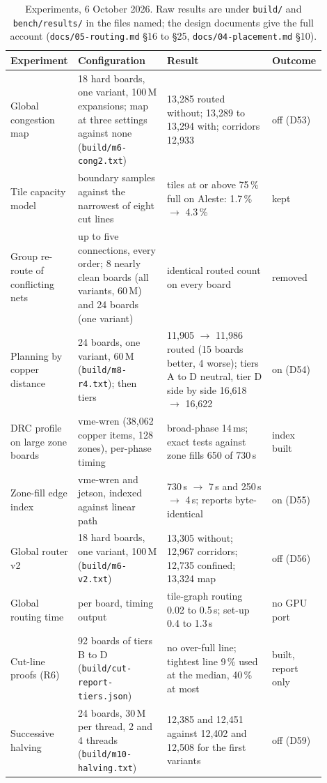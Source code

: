 \documentclass[10pt,a4paper]{article}
\newcommand{\code}[1]{\texttt{#1}}
\begin{document}
{\small
\begin{longtable}{@{}p{0.17\linewidth}p{0.29\linewidth}p{0.33\linewidth}p{0.11\linewidth}@{}}
\caption{Experiments, 6 October 2026. Raw results are under \code{build/} and \code{bench/results/} in the files
named; the design documents give the full account (\code{docs/05-routing.md} \S16 to \S25,
\code{docs/04-placement.md} \S10).}\label{tab:experiments}\\
\toprule Experiment & Configuration & Result & Outcome \\ \midrule \endhead
Global congestion map & 18 hard boards, one variant, 100\,M expansions; map at three settings against none (\code{build/m6-cong2.txt}) & 13,285 routed without; 13,289 to 13,294 with; corridors 12,933 & off (D53) \\
Tile capacity model & boundary samples against the narrowest of eight cut lines & tiles at or above 75\,\% full on Aleste: 1.7\,\% $\to$ 4.3\,\% & kept \\
Group re-route of conflicting nets & up to five connections, every order; 8 nearly clean boards (all variants, 60\,M) and 24 boards (one variant) & identical routed count on every board & removed \\
Planning by copper distance & 24 boards, one variant, 60\,M (\code{build/m8-r4.txt}); then tiers & 11,905 $\to$ 11,986 routed (15 boards better, 4 worse); tiers A to D neutral, tier D side by side 16,618 $\to$ 16,622 & on (D54) \\
DRC profile on large zone boards & vme-wren (38,062 copper items, 128 zones), per-phase timing & broad-phase 14\,ms; exact tests against zone fills 650 of 730\,s & index built \\
Zone-fill edge index & vme-wren and jetson, indexed against linear path & 730\,s $\to$ 7\,s and 250\,s $\to$ 4\,s; reports byte-identical & on (D55) \\
Global router v2 & 18 hard boards, one variant, 100\,M (\code{build/m6-v2.txt}) & 13,305 without; 12,967 corridors; 12,735 confined; 13,324 map & off (D56) \\
Global routing time & per board, timing output & tile-graph routing 0.02 to 0.5\,s; set-up 0.4 to 1.3\,s & no GPU port \\
Cut-line proofs (R6) & 92 boards of tiers B to D (\code{build/cut-report-tiers.json}) & no over-full line; tightest line 9\,\% used at the median, 40\,\% at most & built, report only \\
Successive halving & 24 boards, 30\,M per thread, 2 and 4 threads (\code{build/m10-halving.txt}) & 12,385 and 12,451 against 12,402 and 12,508 for the first variants & off (D59) \\

\end{longtable}}
\end{document}
